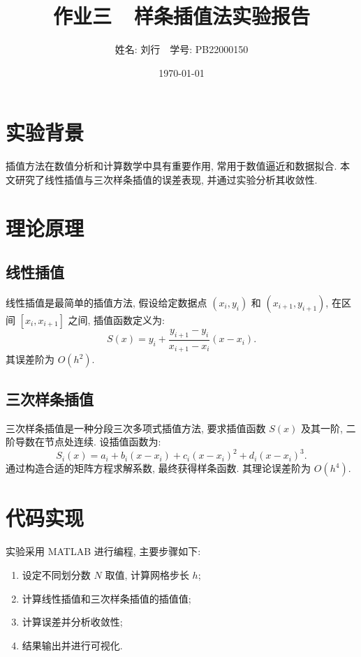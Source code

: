 \documentclass[12pt]{article}
\title{作业三~~样条插值法实验报告}
\author{姓名: 刘行~~学号: PB22000150}
\date{\today}
\begin{document}
\maketitle

\section{实验背景}
插值方法在数值分析和计算数学中具有重要作用, 常用于数值逼近和数据拟合. 本文研究了线性插值与三次样条插值的误差表现, 并通过实验分析其收敛性.

\section{理论原理}

\subsection{线性插值}
线性插值是最简单的插值方法, 假设给定数据点 $(x_i, y_i)$ 和 $(x_{i+1}, y_{i+1})$, 在区间 $[x_i, x_{i+1}]$ 之间, 插值函数定义为:
\begin{equation}
S(x) = y_i + \frac{y_{i+1} - y_i}{x_{i+1} - x_i} (x - x_i).
\end{equation}
其误差阶为 $O(h^2)$.

\subsection{三次样条插值}
三次样条插值是一种分段三次多项式插值方法, 要求插值函数 $S(x)$ 及其一阶, 二阶导数在节点处连续.
设插值函数为:
\begin{equation}
S_i(x) = a_i + b_i (x - x_i) + c_i (x - x_i)^2 + d_i (x - x_i)^3.
\end{equation}
通过构造合适的矩阵方程求解系数, 最终获得样条函数. 其理论误差阶为 $O(h^4)$.

\section{代码实现}
实验采用 MATLAB 进行编程, 主要步骤如下:
\begin{enumerate}
\item 设定不同划分数 $N$ 取值, 计算网格步长 $h$;
\item 计算线性插值和三次样条插值的插值值;
\item 计算误差并分析收敛性;
\item 结果输出并进行可视化.
\end{enumerate}
\end{document}
